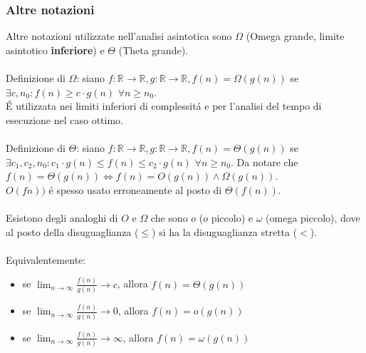 \documentclass{article}
\begin{document}
\subsubsection{Altre notazioni}
Altre notazioni utilizzate nell'analisi asintotica sono $\Omega$ (Omega grande, limite asintotico \textbf{inferiore}) e $\Theta$ (Theta grande).\\\\
Definizione di $\Omega$: siano $f : \mathbb{R} \to \mathbb{R}, g : \mathbb{R} \to \mathbb{R}, f(n) = \Omega(g(n))$ se $\exists c, n_0 : f(n) \ge c \cdot g(n)$ $\forall n \ge n_0$.\\
É utilizzata nei limiti inferiori di complessitá e per l'analisi del tempo di esecuzione nel caso ottimo.\\\\
Definizione di $\Theta$: siano $f : \mathbb{R} \to \mathbb{R}, g : \mathbb{R} \to \mathbb{R}, f(n) = \Theta(g(n))$ se $\exists c_1, c_2, n_0 : c_1 \cdot g(n) \le f(n) \le c_2 \cdot g(n)$ $\forall n \ge n_0$. Da notare che $f(n) = \Theta(g(n)) \iff f(n) = O(g(n)) \wedge \Omega(g(n))$.\\
$O(fn))$ é spesso usato erroneamente al posto di $\Theta(f(n))$.\\\\
Esistono degli analoghi di $O$ e $\Omega$ che sono $o$ ($o$ piccolo) e $\omega$ (omega piccolo), dove al posto della disuguaglianza ($\le$) si ha la disuguaglianza stretta ($<$).\\\\
Equivalentemente:
\begin{itemize}
	\item[] se $\displaystyle \lim_{n \to \infty} \frac{f(n)}{g(n)} \to c$, allora $f(n) = \Theta(g(n))$
	\item[] se $\displaystyle \lim_{n \to \infty} \frac{f(n)}{g(n)} \to 0$, allora $f(n) = o(g(n))$
	\item[] se $\displaystyle \lim_{n \to \infty} \frac{f(n)}{g(n)} \to \infty$, allora $f(n) = \omega(g(n))$
\end{itemize}
\end{document}
